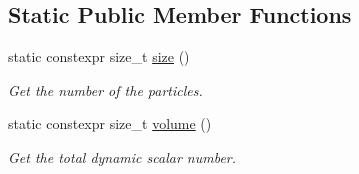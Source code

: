 \subsection*{Static Public Member Functions}
\begin{DoxyCompactItemize}
\item 
static constexpr size\+\_\+t \mbox{\hyperlink{classregu_system_aceb0955bcd3e6ba7a6a1831953ac120b}{size}} ()
\begin{DoxyCompactList}\small\item\em Get the number of the particles. \end{DoxyCompactList}\item 
static constexpr size\+\_\+t \mbox{\hyperlink{classregu_system_a4260b237d36d137b01504c0effd385fa}{volume}} ()
\begin{DoxyCompactList}\small\item\em Get the total dynamic scalar number. \end{DoxyCompactList}\end{DoxyCompactItemize}
